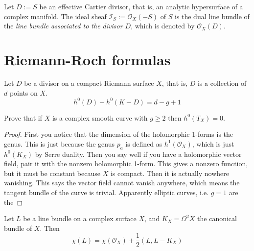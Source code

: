 \begin{definition}
\label{definition-sheaf-associated-to-effective-Cartier-divisor}
Let $D:=S$ be an effective Cartier divisor, that is, an analytic hypersurface of
a complex manifold. The ideal sheaf $\mathcal{I}_S:=\mathcal{O}_X(-S)$ of $S$ is
the dual line bundle of the {\it line bundle associated to the divisor $D$},
which is denoted by $\mathcal{O}_X(D)$.
\end{definition}

\section{Riemann-Roch formulas}
\label{section-Riemann-Roch}

\begin{theorem}
\label{theorem-Riemann-Roch-for-curves}
Let $D$ be a divisor on a compact Riemann surface $X$, that is, $D$ is a
collection of $d$ points on $X$.
\begin{equation}
\label{equation-Riemann-Roch-for-Riemann-surfaces}
h^0(D)-h^0(K-D)=d-g+1
\end{equation}
\end{theorem}

\begin{exercise}
\label{exercise-no-holomorphic-vector-fields-for-g-geq2}
Prove that if $X$ is a complex smooth curve with $g\geq 2$ then $h^0(T_X)=0$.
\end{exercise}

\begin{proof}
First you notice that the dimension of the holomorphic 1-forms is the genus.
This is just because the genus $p_a$ is defined as $h^1(\mathcal{O}_X)$, which
is just $h^0(K_X)$ by Serre duality. Then you say well if you have a holomorphic
vector field, pair it with the nonzero holomorphic 1-form. This gives a nonzero
function, but it must be constant because $X$ is compact. Then it is actually
nowhere vanishing. This says the vector field cannot vanish anywhere, which
means the tangent bundle of the curve is trivial. Apparently elliptic curves,
i.e. $g=1$ are the 
\end{proof}


\begin{theorem}
\label{theorem-Riemann-Roch-for-line-bundles-on-surfaces}
Let $L$ be a line bundle on a complex surface $X$, and $K_X=\Omega^2X$ the
canonical bundle of $X$. Then
\begin{equation}
\label{equation-Riemann-Roch-for-line-bundles-on-surfaces}
\chi(L)=\chi(\mathcal{O}_X)+\frac{1}{2}(L,L-K_X)
\end{equation}
\end{theorem}

